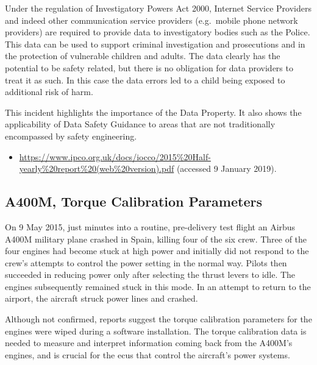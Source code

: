 Under the regulation of Investigatory Powers Act 2000, Internet Service Providers and indeed other communication service providers (e.g.\ mobile phone network providers) are required to provide data to investigatory bodies such as the Police. This data can be used to support criminal investigation and prosecutions and in the protection of vulnerable children and adults. The data clearly has the potential to be safety related, but there is no obligation for data providers to treat it as such. In this case the data errors led to a child being exposed to additional risk of harm.

This incident highlights the importance of the  Data Property. It also shows the applicability of Data Safety Guidance to areas that are not traditionally encompassed by safety engineering.

\begin{samepage}
\begin{itemize}
  \item \raggedright{\href{https://www.ipco.org.uk/docs/iocco/2015\%20Half-yearly\%20report\%20(web\%20version).pdf}{https://www.ipco.org.uk/docs/iocco/2015\%20Half-yearly\%20report\%20(web\%20version).pdf} (accessed 9 January 2019).}
\end{itemize}
\end{samepage}


\subsection{A400M, Torque Calibration Parameters} \label{bkm:incacc:a400m}
On 9 May 2015, just minutes into a routine, pre-delivery test flight an Airbus A400M military plane crashed in Spain, killing four of the six crew. Three of the four engines had become stuck at high power and initially did not respond to the crew's attempts to control the power setting in the normal way. Pilots then succeeded in reducing power only after selecting the thrust levers to idle. The engines subsequently remained stuck in this mode. In an attempt to return to the airport, the aircraft struck power lines and crashed.  

Although not confirmed, reports suggest the torque calibration parameters for the engines were wiped during a software installation. The torque calibration data is needed to measure and interpret information coming back from the A400M's engines, and is crucial for the \glspl{ecu} that control the aircraft's power systems. 

